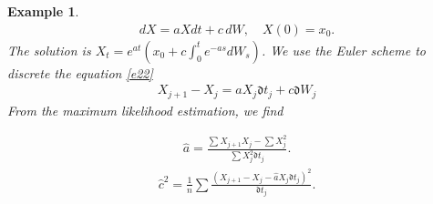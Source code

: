 \documentclass[12pt,reqno, a4paper]{article}
\newtheorem{example}[theorem]{Example}
\numberwithin{equation}{section}
\begin{document}
\begin{example}
\begin{eqnarray}\label{e22}
dX=aXdt+c\,dW,   \quad  X(0)=x_0.
\end{eqnarray}The solution is $X_t=e^{at}(x_0+c\int_0^te^{-as}dW_s)$.   We use the Euler  scheme  to discrete   the equation \eqref{e22}
\begin{eqnarray}\label{e2}
X_{j+1}-X_j=aX_j\mathfrak{d} t_j+c\mathfrak{d} W_j\end{eqnarray}
From the maximum likelihood estimation, we find

\begin{eqnarray}\hat{a}=\frac {\sum  X_{j+1}X_j-\sum X_j^2} {\sum X_j^2\mathfrak{d}t_j}.\label{ex3} \end{eqnarray}
 \begin{eqnarray}
\hat{c}^2=\frac 1 n\sum \frac { (X_{j+1}-X_{j}-\hat{a}X_{j}\mathfrak{d}  t_{j})^2}{{} \mathfrak{d}  t_j}. \label{ex4}\end{eqnarray}


\end{example}
\end{document}

